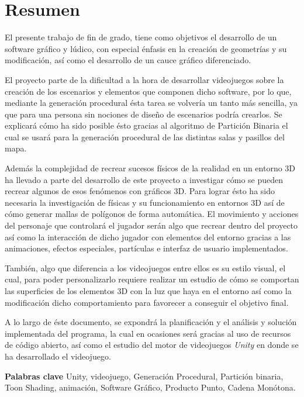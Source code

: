 \chapter{Resumen}
    El presente trabajo de fin de grado, tiene como objetivos el desarrollo de un software gráfico y lúdico, con especial énfasis en la creación de geometrías y su modificación, así como el desarrollo de un cauce gráfico diferenciado.

    El proyecto parte de la dificultad a la hora de desarrollar videojuegos sobre la creación de los escenarios y elementos que componen dicho software, por lo que, mediante la generación procedural ésta tarea se volvería un tanto más sencilla, ya que para una persona sin nociones de diseño de escenarios podría crearlos. Se explicará cómo ha sido posible ésto gracias al algoritmo de Partición Binaria el cual se usará para la generación procedural de las distintas salas y pasillos del mapa.
    
    Además la complejidad de recrear sucesos físicos de la realidad en un entorno 3D ha llevado a parte del desarrollo de este proyecto a investigar cómo se pueden recrear algunos de esos fenómenos con gráficos 3D. Para lograr ésto ha sido necesaria la investigación de físicas y su funcionamiento en entornos 3D así de cómo generar mallas de polígonos de forma automática.  El movimiento y acciones del personaje que controlará el jugador serán algo que recrear dentro del proyecto así como la interacción de dicho jugador con elementos del entorno gracias a las animaciones, efectos especiales, partículas e interfaz de usuario implementados.

    También, algo que diferencia a los videojuegos entre ellos es su estilo visual, el cual, para poder personalizarlo requiere realizar un estudio de cómo se comportan las superficies de los elementos 3D con la luz que haya en el entorno así como la modificación dicho comportamiento para favorecer a conseguir el objetivo final.

    A lo largo de éste documento, se expondrá la planificación y el análisis y solución implementada del programa, la cual en ocasiones será gracias al uso de recursos de código abierto, así como el estudio del motor de videojuegos \textit{Unity} en donde se ha desarrollado el videojuego.

    \textbf{Palabras clave} Unity, videojuego, Generación Procedural, Partición binaria, Toon Shading, animación, Software Gráfico, Producto Punto, Cadena Monótona.
    